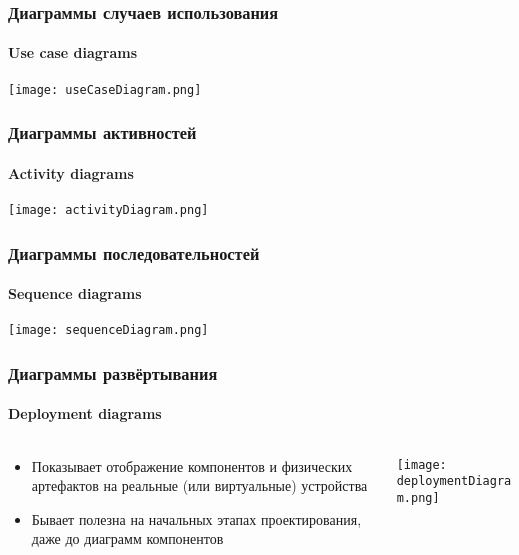 \documentclass{../../slides-style}
\begin{document}
    \begin{frame}
        \frametitle{Диаграммы случаев использования}
        \framesubtitle{Use case diagrams}
        \begin{center}
            \texttt{[image: useCaseDiagram.png]}
        \end{center}
    \end{frame}

    \begin{frame}
        \frametitle{Диаграммы активностей}
        \framesubtitle{Activity diagrams}
        \begin{center}
            \texttt{[image: activityDiagram.png]}
        \end{center}
    \end{frame}

    \begin{frame}
        \frametitle{Диаграммы последовательностей}
        \framesubtitle{Sequence diagrams}
        \begin{center}
            \texttt{[image: sequenceDiagram.png]}
        \end{center}
    \end{frame}

    \begin{frame}
        \frametitle{Диаграммы развёртывания}
        \framesubtitle{Deployment diagrams}
        \begin{columns}
            \begin{column}{0.5\textwidth}
                \begin{itemize}
                    \item Показывает отображение компонентов и физических артефактов на реальные (или виртуальные) устройства
                    \item Бывает полезна на начальных этапах проектирования, даже до диаграмм компонентов
                \end{itemize}
            \end{column}
            \begin{column}{0.5\textwidth}
                \begin{center}
                    \texttt{[image: deploymentDiagram.png]}
                \end{center}
            \end{column}
        \end{columns}
    \end{frame}
\end{document}
